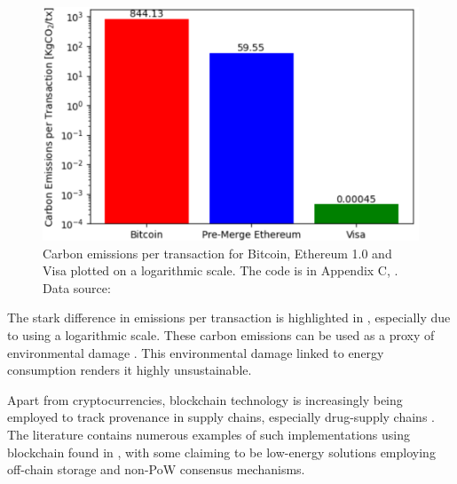 \begin{figure}[h]
    \centering
    \includegraphics[width=13cm,center]{Figures/CarbonEmissionsPlot.png}
    \caption{Carbon emissions per transaction for Bitcoin, Ethereum 1.0 and Visa plotted on a logarithmic scale. The code is in Appendix C, . Data source: \cite{Kohli2023AnSolutions} }
    \label{Figure:CarbonEmissionsPlot}
\end{figure}

The stark difference in emissions per transaction is highlighted in , especially due to using a logarithmic scale. These carbon emissions can be used as a proxy of environmental damage \cite{2022VisaReport}. This environmental damage linked to energy consumption renders it highly unsustainable.

Apart from cryptocurrencies, blockchain technology is increasingly being employed to track provenance in supply chains, especially drug-supply chains \cite{Labaran2021TheNigeria}. The literature contains numerous examples of such implementations using blockchain found in , with some claiming to be low-energy solutions employing off-chain storage and non-PoW consensus mechanisms.

